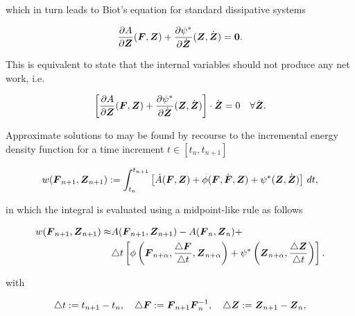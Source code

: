 \documentclass[12pt]{article}
\numberwithin{equation}{section}
\begin{document}
which in turn leads to Biot's equation for standard dissipative systems

\begin{equation} \label{eq:Biots-equation}
  \frac{\partial A}{\partial {\boldsymbol{Z}}} ({\boldsymbol{F}}, {\boldsymbol{Z}})
  +
  \frac{\partial \psi^*}{\partial \dot{{\boldsymbol{Z}}}} ({\boldsymbol{Z}}, \dot{{\boldsymbol{Z}}})
  =
  \mathbf{0}.
\end{equation}

This is equivalent to state that the internal variables should not
produce any net work, i.e.

\begin{equation} \label{eq:internal-no-work}
  \left[
    \frac{\partial A}{\partial {\boldsymbol{Z}}} ({\boldsymbol{F}}, {\boldsymbol{Z}})
    +
    \frac{\partial \psi^*}{\partial \dot{{\boldsymbol{Z}}}} ({\boldsymbol{Z}}, \dot{{\boldsymbol{Z}}})
  \right]
  \cdot
   \dot{{\boldsymbol{Z}}}
  =
  0
  \quad
  \forall \dot{{\boldsymbol{Z}}}.
\end{equation}

Approximate solutions to  may be found by
recourse to the incremental energy density function for a time
increment $t \in [t_n, t_{n+1}]$

\begin{equation} \label{incremental-energy-density}
  w({\boldsymbol{F}}_{n+1}, {\boldsymbol{Z}}_{n+1}) := 
  \int_{t_n}^{t_{n+1}}
  \left[
    \dot{A}({\boldsymbol{F}}, {\boldsymbol{Z}})
    +
    \phi({\boldsymbol{F}}, \dot{{\boldsymbol{F}}}, {\boldsymbol{Z}})
    +
    \psi^*({\boldsymbol{Z}}, \dot{{\boldsymbol{Z}}})
  \right]
  \, dt,
\end{equation}

in which the integral is evaluated using a midpoint-like rule
as follows

\begin{equation} \label{incremental-energy-density-mid-point}
  \begin{split}
    w({\boldsymbol{F}}_{n+1}, {\boldsymbol{Z}}_{n+1}) \approx
    &
    A({\boldsymbol{F}}_{n+1}, {\boldsymbol{Z}}_{n+1}) - A({\boldsymbol{F}}_n, {\boldsymbol{Z}}_n) +
    \\
    &
    \triangle t
    \left[
      \phi
      \left(
        {\boldsymbol{F}}_{n+\alpha}, \frac{\triangle {\boldsymbol{F}}}{\triangle t}, {\boldsymbol{Z}}_{n+\alpha}
      \right)
      +
      \psi^*
      \left(
        {\boldsymbol{Z}}_{n+\alpha}, \frac{\triangle {\boldsymbol{Z}}}{\triangle t}
      \right)
    \right].
  \end{split}
\end{equation}

with

\begin{equation} \label{eq:increments}
  \triangle t := t_{n+1} - t_n,
  \quad
  \triangle {\boldsymbol{F}} := {\boldsymbol{F}}_{n+1} {\boldsymbol{F}}_n^{-1},
  \quad
  \triangle {\boldsymbol{Z}} := {\boldsymbol{Z}}_{n+1} - {\boldsymbol{Z}}_n,
\end{equation}
\end{document}
